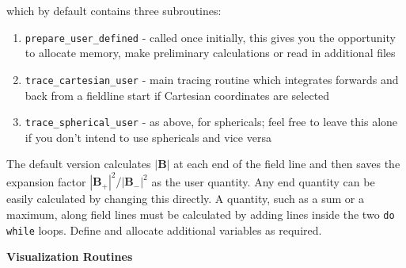 \documentclass[12pt,twoside]{article}
\begin{document}
which by default contains three subroutines:
\begin{enumerate}
\item\texttt{prepare\_user\_defined} - called once initially, this gives you the opportunity to allocate memory, make preliminary calculations or read in additional files

\item\texttt{trace\_cartesian\_user} - main tracing routine which integrates forwards and back from a fieldline start if Cartesian coordinates are selected

\item\texttt{trace\_spherical\_user} - as above, for sphericals; feel free to leave this alone if you don't intend to use sphericals and vice versa
\end{enumerate}

The default version calculates $|\mathbf{B}|$ at each end of the field line and then saves the expansion factor $|\mathbf{B}_+|^2/|\mathbf{B}_-|^2$ as the user quantity. Any end quantity can be easily calculated by changing this directly. A quantity, such as a sum or a maximum, along field lines must be calculated by adding lines inside the two \texttt{do while} loops. Define and allocate additional variables as required.



\vspace{3mm}
{\Large \textbf{Visualization Routines}}
\end{document}
